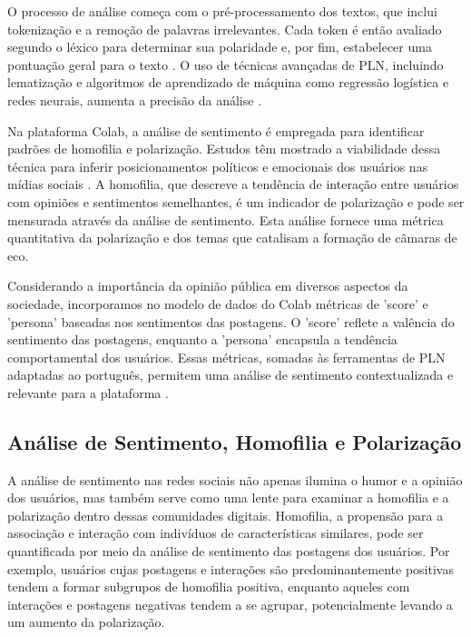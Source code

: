 O processo de análise começa com o pré-processamento dos textos, que inclui tokenização e a remoção de palavras irrelevantes. Cada token é então avaliado segundo o léxico para determinar sua polaridade e, por fim, estabelecer uma pontuação geral para o texto \cite{2013_Haddi}. O uso de técnicas avançadas de PLN, incluindo lematização e algoritmos de aprendizado de máquina como regressão logística e redes neurais, aumenta a precisão da análise \cite{2014_Kim}.

Na plataforma Colab, a análise de sentimento é empregada para identificar padrões de homofilia e polarização. Estudos têm mostrado a viabilidade dessa técnica para inferir posicionamentos políticos e emocionais dos usuários nas mídias sociais \cite{2014_Hutto}. A homofilia, que descreve a tendência de interação entre usuários com opiniões e sentimentos semelhantes, é um indicador de polarização e pode ser mensurada através da análise de sentimento. Esta análise fornece uma métrica quantitativa da polarização e dos temas que catalisam a formação de câmaras de eco.

Considerando a importância da opinião pública em diversos aspectos da sociedade, incorporamos no modelo de dados do Colab métricas de 'score' e 'persona' baseadas nos sentimentos das postagens. O 'score' reflete a valência do sentimento das postagens, enquanto a 'persona' encapsula a tendência comportamental dos usuários. Essas métricas, somadas às ferramentas de PLN adaptadas ao português, permitem uma análise de sentimento contextualizada e relevante para a plataforma \cite{2012_Souza_IP}.

\subsection*{Análise de Sentimento, Homofilia e Polarização}

A análise de sentimento nas redes sociais não apenas ilumina o humor e a opinião dos usuários, mas também serve como uma lente para examinar a homofilia e a polarização dentro dessas comunidades digitais. Homofilia, a propensão para a associação e interação com indivíduos de características similares, pode ser quantificada por meio da análise de sentimento das postagens dos usuários. Por exemplo, usuários cujas postagens e interações são predominantemente positivas tendem a formar subgrupos de homofilia positiva, enquanto aqueles com interações e postagens negativas tendem a se agrupar, potencialmente levando a um aumento da polarização.

